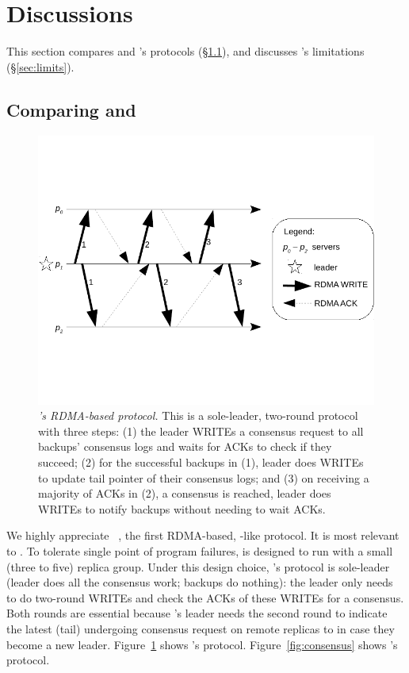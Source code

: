 \section{Discussions}\label{sec:discuss}
% 
This section compares \xxx and \dare's protocols (\S\ref{sec:compare}), and 
discusses \xxx's limitations (\S\ref{sec:limits}).

\subsection{Comparing \xxx and \dare}\label{sec:compare}

\begin{figure}[t]
\centering
\vspace{-.4in}
\includegraphics[width=.35\textwidth]{figures/dare_algo}
\vspace{-.6in}
\caption{{\em \dare's RDMA-based protocol.} This is a sole-leader, 
two-round protocol with three steps: (1) the leader WRITEs a consensus request 
to all backups' consensus logs and waits for ACKs to check if they succeed; 
(2) for the successful backups in (1), leader does WRITEs to update tail 
pointer of their consensus logs; and (3) on receiving a majority of ACKs in (2), 
a consensus is reached, leader does WRITEs to notify backups without needing to 
wait ACKs.}
\label{fig:dare}
\vspace{-.20in}
\end{figure}

We highly appreciate \dare~\cite{dare:hpdc15}, the first RDMA-based, 
\paxos-like protocol. It is most relevant to \xxx. To tolerate single point of 
program failures, \dare is designed to run with a small (three to five) replica 
group. Under this design choice, \dare's protocol is sole-leader (leader 
does all the consensus work; backups do nothing): the leader only needs to do 
two-round WRITEs and check the ACKs of these WRITEs for a consensus. Both 
rounds are essential because \dare's leader needs the second round to indicate 
the latest (tail) undergoing consensus request on remote replicas to in case 
they become a new leader. Figure~\ref{fig:dare} shows \dare's protocol. 
Figure~\ref{fig:consensus} shows \xxx's protocol.

